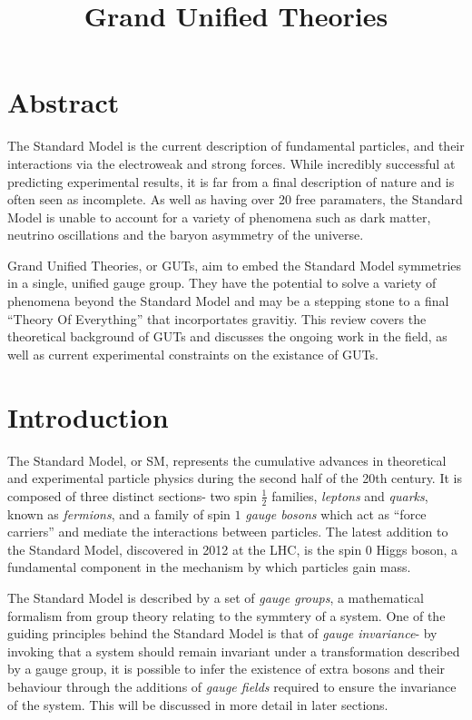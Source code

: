 \documentclass{article}
\title{Grand Unified Theories}
\begin{document}
\maketitle

\section*{Abstract}
\addtocounter{section}{1}
The Standard Model is the current description of fundamental particles, and their interactions via the electroweak and strong forces. While incredibly successful at predicting experimental results, it is far from a final description of nature and is often seen as incomplete. As well as having over 20 free paramaters, the Standard Model is unable to account for a variety of phenomena such as dark matter, neutrino oscillations and the baryon asymmetry of the universe.

Grand Unified Theories, or GUTs, aim to embed the Standard Model symmetries in a single, unified gauge group. They have the potential to solve a variety of phenomena beyond the Standard Model and may be a stepping stone to a final ``Theory Of Everything'' that incorportates gravitiy. This review covers the theoretical background of GUTs and discusses the ongoing work in the field, as well as current experimental constraints on the existance of GUTs.

\clearpage
\tableofcontents
\clearpage
\section{Introduction}%

The Standard Model, or SM, represents the cumulative advances in theoretical and experimental particle physics during the second half of the 20th century. It is composed of three distinct sections- two spin $\frac{1}{2}$ families, \textit{leptons} and \textit{quarks}, known as \textit{fermions}, and a family of spin $1$ \textit{gauge bosons} which act as ``force carriers'' and mediate the interactions between particles. The latest addition to the Standard Model, discovered in 2012 at the LHC, is the spin $0$ Higgs boson, a fundamental component in the mechanism by which particles gain mass. 

The Standard Model is described by a set of \textit{gauge groups}, a mathematical formalism from group theory relating to the symmtery of a system. One of the guiding principles behind the Standard Model is that of \textit{gauge invariance}- by invoking that a system should remain invariant under a transformation described by a gauge group, it is possible to infer the existence of extra bosons and their behaviour through the additions of \textit{gauge fields} required to ensure the invariance of the system. This will be discussed in more detail in later sections.
\end{document}
